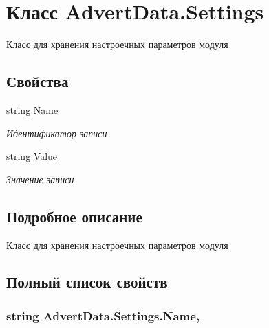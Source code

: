 \hypertarget{class_advert_data_1_1_settings}{\section{Класс Advert\+Data.\+Settings}
\label{class_advert_data_1_1_settings}
}


Класс для хранения настроечных параметров модуля  


\subsection*{Свойства}
\begin{DoxyCompactItemize}
\item 
string \hyperlink{class_advert_data_1_1_settings_ad0ccc3e75e903a4729f756b57f423890}{Name}
\begin{DoxyCompactList}\small\item\em Идентификатор записи \end{DoxyCompactList}\item 
string \hyperlink{class_advert_data_1_1_settings_aee6785e9f9bc8a7a75494e85ef379d91}{Value}
\begin{DoxyCompactList}\small\item\em Значение записи \end{DoxyCompactList}\end{DoxyCompactItemize}


\subsection{Подробное описание}
Класс для хранения настроечных параметров модуля 



\subsection{Полный список свойств}
\hypertarget{class_advert_data_1_1_settings_ad0ccc3e75e903a4729f756b57f423890}{
\subsubsection[{Name}]{\setlength{\rightskip}{0pt plus 5cm}string Advert\+Data.\+Settings.\+Name\hspace{0.3cm}{\ttfamily [get]}, {\ttfamily [set]}}}\label{class_advert_data_1_1_settings_ad0ccc3e75e903a4729f756b57f423890}


